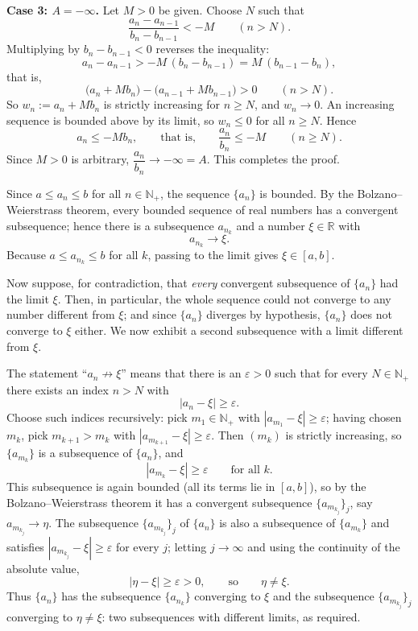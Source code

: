 \documentclass[11pt,a4paper]{article}
\newenvironment{solution}[1]{%
  \par\addvspace{1.7ex}%
  \noindent{\color{solutioncolor}\textbf{#1}}\hspace{0.55em}\ignorespaces}%
  {\par\addvspace{0.9ex}}
\begin{document}
\begin{solution}{Solution 2.3.15}
\medskip
\noindent\textbf{Case 3: $A = -\infty$.}
Let $M > 0$ be given. Choose $N$ such that
\[
\frac{a_n - a_{n-1}}{b_n - b_{n-1}} < -M \qquad (n > N).
\]
Multiplying by $b_n - b_{n-1} < 0$ reverses the inequality:
\[
a_n - a_{n-1} > -M\,(b_n - b_{n-1}) = M\,(b_{n-1} - b_n),
\]
that is,
\[
\bigl(a_n + M b_n\bigr) - \bigl(a_{n-1} + M b_{n-1}\bigr) > 0 \qquad (n > N).
\]
So $w_n := a_n + M b_n$ is strictly increasing for $n \ge N$, and $w_n \to 0$. An increasing sequence is bounded above by its limit, so $w_n \le 0$ for all $n \ge N$. Hence
\[
a_n \le -M b_n, \qquad\text{that is,}\qquad \frac{a_n}{b_n} \le -M \qquad (n \ge N).
\]
Since $M > 0$ is arbitrary, $\dfrac{a_n}{b_n} \to -\infty = A$. This completes the proof.
\end{solution}

\begin{solution}{Solution 2.3.16}\label{xs:2.3.16}
Since $a \le a_n \le b$ for all $n \in \mathbb{N}_+$, the sequence $\{a_n\}$ is bounded. By the Bolzano--Weierstrass theorem, every bounded sequence of real numbers has a convergent subsequence; hence there is a subsequence $a_{n_k}$ and a number $\xi \in \mathbb{R}$ with
\[
a_{n_k} \longrightarrow \xi .
\]
Because $a \le a_{n_k} \le b$ for all $k$, passing to the limit gives $\xi \in [a,b]$.

Now suppose, for contradiction, that \emph{every} convergent subsequence of $\{a_n\}$ had the limit $\xi$. Then, in particular, the whole sequence could not converge to any number different from $\xi$; and since $\{a_n\}$ diverges by hypothesis, $\{a_n\}$ does not converge to $\xi$ either. We now exhibit a second subsequence with a limit different from $\xi$.

The statement ``$a_n \not\to \xi$'' means that there is an $\varepsilon > 0$ such that for every $N \in \mathbb{N}_+$ there exists an index $n > N$ with
\[
|a_n - \xi| \ge \varepsilon .
\]
Choose such indices recursively: pick $m_1 \in \mathbb{N}_+$ with $|a_{m_1} - \xi| \ge \varepsilon$; having chosen $m_k$, pick $m_{k+1} > m_k$ with $|a_{m_{k+1}} - \xi| \ge \varepsilon$. Then $(m_k)$ is strictly increasing, so $\{a_{m_k}\}$ is a subsequence of $\{a_n\}$, and
\[
|a_{m_k} - \xi| \ge \varepsilon \qquad \text{for all } k.
\]
This subsequence is again bounded (all its terms lie in $[a,b]$), so by the Bolzano--Weierstrass theorem it has a convergent subsequence $\{a_{m_{k_j}}\}_{j}$, say $a_{m_{k_j}} \to \eta$. The subsequence $\{a_{m_{k_j}}\}_j$ of $\{a_n\}$ is also a subsequence of $\{a_{m_k}\}$ and satisfies $|a_{m_{k_j}} - \xi| \ge \varepsilon$ for every $j$; letting $j \to \infty$ and using the continuity of the absolute value,
\[
|\eta - \xi| \ge \varepsilon > 0, \qquad\text{so}\qquad \eta \neq \xi .
\]
Thus $\{a_n\}$ has the subsequence $\{a_{n_k}\}$ converging to $\xi$ and the subsequence $\{a_{m_{k_j}}\}_j$ converging to $\eta \neq \xi$: two subsequences with different limits, as required.
\end{solution}
\end{document}
